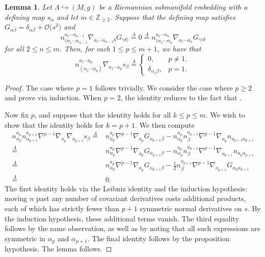 \documentclass[pdftex]{sigma}
\numberwithin{equation}{section}
\newtheorem{Lemma}[Theorem]{Lemma}
\renewcommand{\=}{\stackrel \Lambda =}
\newcommand{\csdot}{\hspace{-0.75mm} \cdot \hspace{-0.75mm}}
\begin{document}
\begin{Lemma} \label{normal-derivs-s}
Let $\Lambda \hookrightarrow (M,g)$ be a Riemannian submanifold embedding with a defining map $s_{\alpha}$ and let $m \in \mathbb{Z}_{\geq 2}$. Suppose that the defining map satisfies $G_{\alpha \beta} = \delta_{\alpha \beta} + \mathcal{O}\bigl(s^2\bigr)$ and
\[n^{a_1 \cdots a_{n-1}}_{(\alpha_1 \cdots \alpha_{n-1}} \nabla_{a_1 \cdots a_{n-1} b} G_{\gamma \delta)} \= 0 \= n^{a_1\cdots a_n}_{(\alpha_1 \cdots \alpha_n} \nabla_{a_1 \cdots a_n} G_{\gamma) \delta} \]
for all $2 \leq n \leq m$.
Then, for each $1 \leq p \leq m+1$, we have that
\[n^{a_1 \cdots a_p}_{(\alpha_1 \cdots \alpha_p)} \nabla_{a_1 \cdots a_p} s_{\beta} \= \begin{cases}
0, & p \neq 1, \\
\delta_{\alpha_1 \beta}, & p = 1 .
\end{cases}\]
\end{Lemma}
\begin{proof}
The case where $p=1$ follows trivially. We consider the case where $p \geq 2$ and prove via induction. When $p=2$, the identity reduces to the fact that \smash{$n \csdot \beta \= 0$}.

Now fix $p$, and suppose that the identity holds for all $k \leq p \leq m$. We wish to show that the identity holds for $k=p+1$. We then compute
\begin{align*}
 n^{a_{p}}_{\alpha_{p}} n^{a_{p+1}}_{\alpha_{p+1}} \nabla^{p-1} \nabla_{a_p} \nabla_{a_{p+1}} s_{\beta} \={}& n^{a_{p}}_{\alpha_{p}} \nabla^{p-1} \nabla_{a_{p}} G_{\alpha_{p+1} \beta} - n^{a_{p}}_{\alpha_{p}} n^{a_{p+1}}_{\beta} \nabla^{p-1} \nabla_{a_{p}} n_{a_{p+1} \alpha_{p+1}}\\
\={}& n^{a_{p}}_{\alpha_{p}} \nabla^{p-1} \nabla_{a_{p}} G_{\alpha_{p+1} \beta} -n^{a_{p}}_{\alpha_{p}} n^{a_{p+1}}_{\beta} \nabla^{p-1} \nabla_{a_{p+1}} n_{a_{p} \alpha_{p+1}}\\
\={}& n^{a_{p}}_{\alpha_{p}} \nabla^{p-1} \nabla_{a_{p}} G_{\alpha_{p+1} \beta} - \frac{1}{2} n^{a_{p+1}}_{\beta} \nabla^{p-1} \nabla_{a_{p+1}} G_{\alpha_{p} \alpha_{p+1}}\\
\={}& 0 .
\end{align*}
The first identity holds via the Leibniz identity and the induction hypothesis: moving $n$ past any number of covariant derivatives costs additional products, each of which has strictly fewer than $p+1$ symmetric normal derivatives on $s$. By the induction hypothesis, these additional terms vanish. The third equality follows by the same observation, as well as by noting that all such expressions are symmetric in $\alpha_{p}$ and $\alpha_{p+1}$. The final identity follows by the proposition hypothesis. The lemma follows.
\end{proof}
\end{document}
